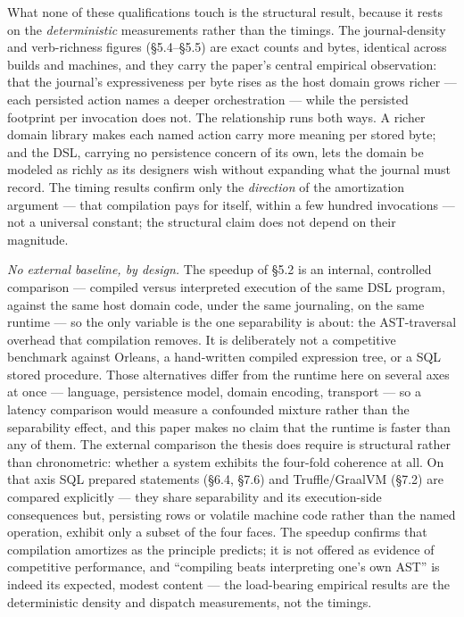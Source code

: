 \documentclass[
]{article}
\newcounter{none} %
\begin{document}
What none of these qualifications touch is the structural result,
because it rests on the \emph{deterministic} measurements rather than
the timings. The journal-density and verb-richness figures (§5.4--§5.5)
are exact counts and bytes, identical across builds and machines, and
they carry the paper's central empirical observation: that the journal's
expressiveness per byte rises as the host domain grows richer --- each
persisted action names a deeper orchestration --- while the persisted
footprint per invocation does not. The relationship runs both ways. A
richer domain library makes each named action carry more meaning per
stored byte; and the DSL, carrying no persistence concern of its own,
lets the domain be modeled as richly as its designers wish without
expanding what the journal must record. The timing results confirm only
the \emph{direction} of the amortization argument --- that compilation
pays for itself, within a few hundred invocations --- not a universal
constant; the structural claim does not depend on their magnitude.

\emph{No external baseline, by design.} The speedup of §5.2 is an
internal, controlled comparison --- compiled versus interpreted
execution of the same DSL program, against the same host domain code,
under the same journaling, on the same runtime --- so the only variable
is the one separability is about: the AST-traversal overhead that
compilation removes. It is deliberately not a competitive benchmark
against Orleans, a hand-written compiled expression tree, or a SQL
stored procedure. Those alternatives differ from the runtime here on
several axes at once --- language, persistence model, domain encoding,
transport --- so a latency comparison would measure a confounded mixture
rather than the separability effect, and this paper makes no claim that
the runtime is faster than any of them. The external comparison the
thesis does require is structural rather than chronometric: whether a
system exhibits the four-fold coherence at all. On that axis SQL
prepared statements (§6.4, §7.6) and Truffle/GraalVM (§7.2) are compared
explicitly --- they share separability and its execution-side
consequences but, persisting rows or volatile machine code rather than
the named operation, exhibit only a subset of the four faces. The
speedup confirms that compilation amortizes as the principle predicts;
it is not offered as evidence of competitive performance, and
``compiling beats interpreting one's own AST'' is indeed its expected,
modest content --- the load-bearing empirical results are the
deterministic density and dispatch measurements, not the timings.
\end{document}
